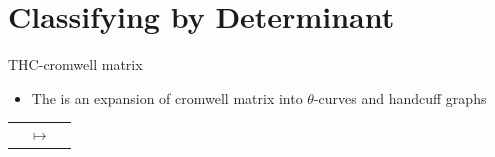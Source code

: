 \section{Classifying by Determinant}
\begin{frame}{THC-cromwell matrix}
	\begin{itemize}
		\item The  is an expansion of cromwell matrix into $\theta$-curves and handcuff graphs
	\end{itemize}
	\vspace{1cm}
	\begin{tabu}{X[5c]X[c]X[5c]}
		 &			
		$\longmapsto$ &
		 &
	\end{tabu}
	
\end{frame}

